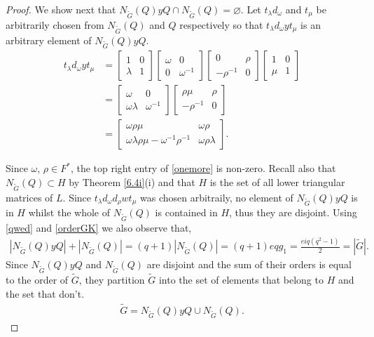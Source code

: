 \begin{proof}
We show next that $N_{\widetilde{G}}(Q) y Q \cap N_{\widetilde{G}}(Q) = \varnothing$. Let $t_\lambda d_\omega$ and $t_\mu$ be arbitrarily chosen from $N_{\widetilde{G}}(Q)$ and $Q$ respectively so that $t_\lambda d_\omega y t_\mu$ is an arbitrary element of $N_{\widetilde{G}}(Q) y Q$.
\begin{align}\label{onemore} t_\lambda d_\omega y t_\mu &= \begin{bmatrix} 1 & 0 \\ \lambda & 1 \end{bmatrix} \begin{bmatrix} \omega & 0 \\ 0 & \omega^{-1} \end{bmatrix} \begin{bmatrix} 0 & \rho \\ -\rho^{-1} & 0 \end{bmatrix}  \begin{bmatrix} 1 & 0 \\ \mu & 1 \end{bmatrix} \nonumber
\\[1.5ex] &= \begin{bmatrix} \omega & 0 \\ \omega \lambda & \omega^{-1} \end{bmatrix} \begin{bmatrix} \rho \mu & \rho \\ -\rho^{-1} & 0 \end{bmatrix} \nonumber
\\[1.5ex] &= \begin{bmatrix} \omega \rho \mu & \omega \rho  \\ \omega \lambda \rho \mu - \omega^{-1} \rho^{-1} & \omega \rho \lambda \end{bmatrix}.
\end{align}

Since $\omega$, $\rho \in F^*$, the top right entry of \eqref{onemore} is non-zero. Recall also that $N_{\widetilde{G}}(Q) \subset H$ by Theorem \ref{6.4i}(i) and that $H$ is the set of all lower triangular matrices of $L$. Since $t_\lambda d_\omega d_\rho w t_\mu$ was chosen arbitraily, no element of $N_{\widetilde{G}}(Q) y Q$ is in $H$ whilst the whole of $N_{\widetilde{G}}(Q)$ is contained in $H$, thus they are disjoint. Using \eqref{qwed} and \eqref{orderGK} we also observe that,
\begin{align*} |N_{\widetilde{G}}(Q) y Q| + |N_{\widetilde{G}}(Q)| = (q+1)|N_{\widetilde{G}}(Q)| = (q+1)eqg_1 = \frac{eiq(q^2-1)}{2} = |{\widetilde{G}}|.
\end{align*}
Since $N_{\widetilde{G}}(Q) y Q$ and $N_{\widetilde{G}}(Q)$ are disjoint and the sum of their orders is equal to the order of ${\widetilde{G}}$, they partition ${\widetilde{G}}$ into the set of elements that belong to $H$ and the set that don't.
\begin{align}\label{gsplit} {\widetilde{G}} = N_{\widetilde{G}}(Q) y Q \cup N_{\widetilde{G}}(Q).
\end{align}


\end{proof}
